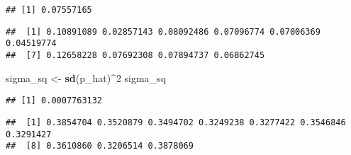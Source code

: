 \documentclass[]{article}
\newenvironment{Shaded}{\begin{snugshade}}{\end{snugshade}}
\newcommand{\DecValTok}[1]{\textcolor[rgb]{0.00,0.00,0.81}{#1}}
\newcommand{\FloatTok}[1]{\textcolor[rgb]{0.00,0.00,0.81}{#1}}
\newcommand{\KeywordTok}[1]{\textcolor[rgb]{0.13,0.29,0.53}{\textbf{#1}}}
\newcommand{\NormalTok}[1]{#1}
\newcommand{\OperatorTok}[1]{\textcolor[rgb]{0.81,0.36,0.00}{\textbf{#1}}}
\newcommand{\StringTok}[1]{\textcolor[rgb]{0.31,0.60,0.02}{#1}}
\begin{document}
\begin{Shaded}
\end{Shaded}

\begin{verbatim}
## [1] 0.07557165
\end{verbatim}

\begin{Shaded}
\end{Shaded}

\begin{verbatim}
##  [1] 0.10891089 0.02857143 0.08092486 0.07096774 0.07006369 0.04519774
##  [7] 0.12658228 0.07692308 0.07894737 0.06862745
\end{verbatim}

\begin{Shaded}
\begin{Highlighting}[]
\NormalTok{sigma_sq <-}\StringTok{ }\KeywordTok{sd}\NormalTok{(p_hat)}\OperatorTok{^}\DecValTok{2}
\NormalTok{sigma_sq}
\end{Highlighting}
\end{Shaded}

\begin{verbatim}
## [1] 0.0007763132
\end{verbatim}

\begin{Shaded}
\end{Shaded}

\begin{verbatim}
##  [1] 0.3854704 0.3520879 0.3494702 0.3249238 0.3277422 0.3546846 0.3291427
##  [8] 0.3610860 0.3206514 0.3878069
\end{verbatim}
\end{document}
